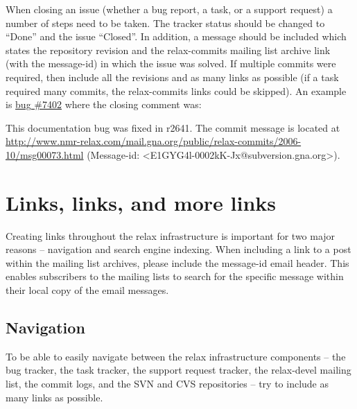 When closing an issue (whether a bug report, a task, or a support request) a number of steps need to be taken.
The tracker status should be changed to ``Done'' and the issue ``Closed''.
In addition, a message should be included which states the repository revision and the relax-commits mailing list archive link (with the message-id) in which the issue was solved.
If multiple commits were required, then include all the revisions and as many links as possible (if a task required many commits, the relax-commits links could be skipped).
An example is \href{https://web.archive.org/web/https://gna.org/bugs/?7402}{bug \#7402} where the closing comment was:

\begin{exampleenv}
This documentation bug was fixed in r2641. The commit message is located at \href{http://www.nmr-relax.com/mail.gna.org/public/relax-commits/2006-10/msg00073.html}{http://www.nmr-relax.com/mail.gna.org/public/relax-commits/2006-10/msg00073.html} (Message-id: <E1GYG4l-0002kK-Jx@subversion.gna.org>).
\end{exampleenv}




\section{Links, links, and more links}

Creating links throughout the relax infrastructure is important for two major reasons -- navigation and search engine indexing.
When including a link to a post within the mailing list archives, please include the message-id email header.
This enables subscribers to the mailing lists to search for the specific message within their local copy of the email messages.



\subsection{Navigation}

To be able to easily navigate between the relax infrastructure components -- the bug tracker, the task tracker, the support request tracker, the relax-devel mailing list, the commit logs, and the SVN and CVS repositories -- try to include as many links as possible.

